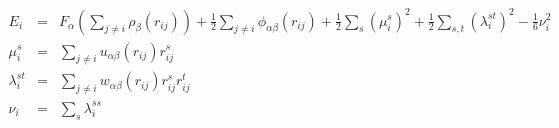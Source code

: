 \documentclass[12pt]{article}
\begin{document}
\begin{eqnarray*}
E_i & = & F_\alpha \left( \sum_{j\neq i} \rho_\beta (r_{ij}) \right) + \frac{1}{2} \sum_{j\neq i}\phi_{\alpha\beta}(r_{ij})+ \frac{1}{2} \sum_s (\mu_i^s)^2 + \frac{1}{2} \sum_{s,t} (\lambda_i^{st})^2 - \frac{1}{6} \nu_i^2 \\
%
\mu_i^s & = & \sum_{j\neq i}u_{\alpha\beta}(r_{ij})r_{ij}^s\\
%
\lambda_i^{st} & = & \sum_{j\neq i}w_{\alpha\beta}(r_{ij})r_{ij}^sr_{ij}^t\\
%
\nu_i & = & \sum_s\lambda_i^{ss}
\end{eqnarray*}
\end{document}
